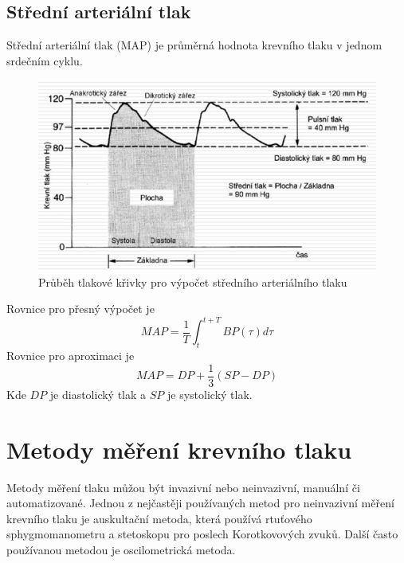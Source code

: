 \subsection{Střední arteriální tlak}
Střední arteriální tlak (MAP) je průměrná hodnota krevního tlaku v jednom srdečním cyklu.
\begin{figure}[H]
    \caption{Průběh tlakové křivky pro výpočet středního arteriálního tlaku \cite{cite:4}}
    \includegraphics[width=1\textwidth]{pictures/map.jpg}
\end{figure}
Rovnice pro přesný výpočet je
\begin{equation}
    MAP = \frac{1}{T} \int_{t}^{t + T} BP(\tau) d\tau
\end{equation}
Rovnice pro aproximaci je
\begin{equation}
    MAP = DP + \frac{1}{3}(SP - DP)
\end{equation}
Kde $DP$ je diastolický tlak a $SP$ je systolický tlak.
\section{Metody měření krevního tlaku}
Metody měření tlaku můžou být invazivní nebo neinvazivní, manuální či automatizované. Jednou z nejčastěji používaných metod pro neinvazivní měření
krevního tlaku je auskultační metoda, která používá rtuťového sphygmomanometru a stetoskopu pro poslech Korotkovových zvuků. Další často používanou metodou je oscilometrická metoda.
\cite{cite:Fabian}
